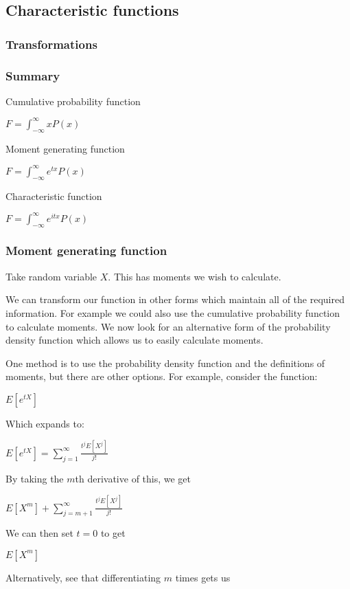 
\subsection{Characteristic functions}

\subsubsection{Transformations}

\subsubsection{Summary}

Cumulative probability function

\(F=\int_{-\infty }^\infty xP(x)\)

Moment generating function

\(F=\int_{-\infty }^\infty e^{tx}P(x)\)

Characteristic function

\(F=\int_{-\infty }^\infty e^{itx}P(x)\)

\subsubsection{Moment generating function}

Take random variable \(X\). This has moments we wish to calculate.

We can transform our function in other forms which maintain all of the required information. For example we could also use the cumulative probability function to calculate moments. We now look for an alternative form of the probability density function which allows us to easily calculate moments.

One method is to use the probability density function and the definitions of moments, but there are other options. For example, consider the function:

\(E[e^{tX}]\)

Which expands to:

\(E[e^{tX}]=\sum_{j=1}^\infty \frac{t^jE[X^j]}{j!}\)

By taking the \(m\)th derivative of this, we get

\(E[X^m]+\sum_{j=m+1}^\infty \frac{t^jE[X^j]}{j!}\)

We can then set \(t=0\) to get

\(E[X^m]\)

Alternatively, see that differentiating \(m\) times gets us

